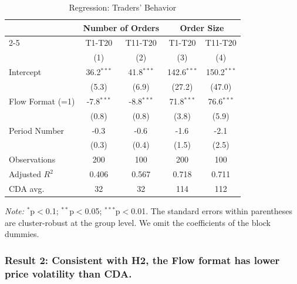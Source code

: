 \documentclass[12pt]{article}
\begin{document}


\begin{table}[H]
\centering    
\caption{Regression: Traders' Behavior}
\begin{threeparttable}
\begin{tabular}{@{\extracolsep{5pt}}lcccc}
\toprule
& \multicolumn{2}{c}{Number of Orders} & \multicolumn{2}{c}{Order Size} \\
\cmidrule{2-5}
& T1-T20 & T11-T20 & T1-T20 & T11-T20 \\
& (1) & (2) & (3) & (4) \\
\midrule
Intercept & 36.2$^{***}$ & 41.8$^{***}$ & 142.6$^{***}$ & 150.2$^{***}$ \\
  & (5.3) & (6.9) & (27.2) & (47.0) \\
Flow Format (=1) & -7.8$^{***}$ & -8.8$^{***}$ & 71.8$^{***}$ & 76.6$^{***}$ \\
  & (0.8) & (0.8) & (3.8) & (5.9) \\
Period Number  & -0.3$^{}$ & -0.6$^{}$ & -1.6$^{}$ & -2.1$^{}$ \\
  & (0.3) & (0.4) & (1.5) & (2.5) \\
\midrule
Observations & 200 & 100 & 200 & 100 \\
Adjusted $R^2$ & 0.406 & 0.567 & 0.718 & 0.711 \\
\midrule
CDA avg. & 32 & 32 & 114 & 112 \\
\bottomrule
\end{tabular}
\begin{tablenotes}
\footnotesize
\textit{Note:} $^{*}$p$<$0.1; $^{**}$p$<$0.05; $^{***}$p$<$0.01. The standard errors within parentheses are cluster-robust at the group level. We omit the coefficients of the block dummies. 
\end{tablenotes}
\end{threeparttable}
\label{tab:TradersBehavior}
\end{table}

\subsubsection*{Result 2: Consistent with H2, the Flow format has lower price volatility than CDA.}
\end{document}
